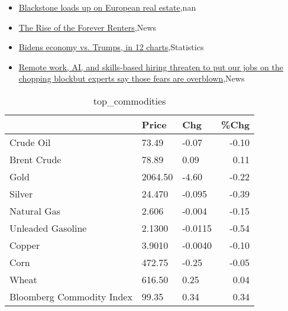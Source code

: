 \documentclass{article}%
\begin{document}
\begin{itemize}
\item%
\href{https://reddit.com/r/Economics/comments/18pihvq/blackstone\_loads\_up\_on\_european\_real\_estate/}{Blackstone loads up on European real estate},nan%
\item%
\href{https://reddit.com/r/Economics/comments/18pd1jg/the\_rise\_of\_the\_forever\_renters/}{The Rise of the Forever Renters},News%
\item%
\href{https://reddit.com/r/Economics/comments/18pbqgm/bidens\_economy\_vs\_trumps\_in\_12\_charts/}{Bidens economy vs. Trumps, in 12 charts},Statistics%
\item%
\href{https://reddit.com/r/Economics/comments/18pa2fu/remote\_work\_ai\_and\_skillsbased\_hiring\_threaten\_to/}{Remote work, AI, and skills-based hiring threaten to put our jobs on the chopping blockbut experts say those fears are overblown},News%
\end{itemize}%


\begin{table}[htbp]%
\caption{top\_commodities}%
\centering%
\begin{adjustbox}{width=1\textwidth}%
\begin{tabular}{lllr}
\toprule
                          &   Price &     Chg &  \%Chg \\
\midrule
               Crude Oil  &   73.49 &   -0.07 & -0.10 \\
             Brent Crude  &   78.89 &    0.09 &  0.11 \\
                    Gold  & 2064.50 &   -4.60 & -0.22 \\
                  Silver  &  24.470 &  -0.095 & -0.39 \\
             Natural Gas  &   2.606 &  -0.004 & -0.15 \\
       Unleaded Gasoline  &  2.1300 & -0.0115 & -0.54 \\
                  Copper  &  3.9010 & -0.0040 & -0.10 \\
                    Corn  &  472.75 &   -0.25 & -0.05 \\
                   Wheat  &  616.50 &    0.25 &  0.04 \\
Bloomberg Commodity Index &   99.35 &    0.34 &  0.34 \\
\bottomrule
\end{tabular}
%
\end{adjustbox}%
\end{table}

%
\end{document}
